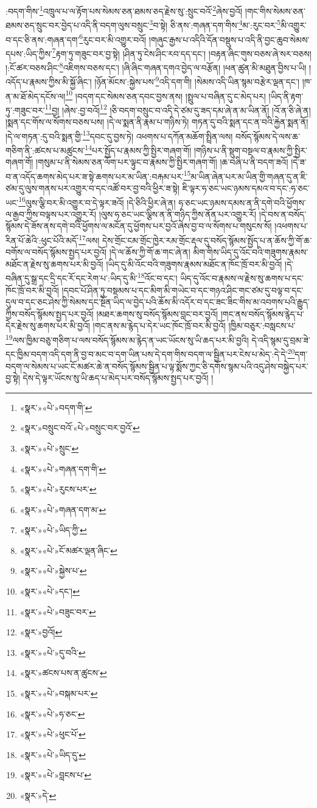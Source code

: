 :བདག་གིས་\footnote{«སྣར་»«པེ་»བདག་གི་}འཁྲུལ་པ་ལ་རྟོག་པས་སེམས་ཅན་ཐམས་ཅད་རྗེས་སུ་:སྲུང་བའོ་\footnote{«སྣར་»བསྲུང་བའོ་«པེ་»བསྲུང་བར་བྱའོ་}ཞེས་བྱའོ། །གང་གིས་སེམས་ཅན་ཐམས་ཅད་སྲུང་བར་བྱེད་པ་འདི་ནི་བདག་ལུས་བསྲུང་\footnote{«སྣར་»«པེ་»སྲུང་}བ་སྟེ། ཅི་ནས་:གཞན་དག་གིས་\footnote{«སྣར་»«པེ་»གཞན་དག་གི་}མ་:རུང་བར་\footnote{«སྣར་»«པེ་»རུངས་པར་}མི་འགྱུར་བ་དང་ཅི་ནས་:གཞན་དག་\footnote{«སྣར་»«པེ་»གཞན་དག་མ་}རུང་བར་མི་འགྱུར་བའོ། །གཞུང་རྒྱས་པ་འདིའི་དོན་བསྡུས་པ་འདི་ནི་བྱང་ཆུབ་སེམས་དཔས་:ཡིད་ཀྱིས་\footnote{«སྣར་»«པེ་»ཡིད་ཀྱི་}རྟག་ཏུ་གཟུང་བར་བྱ་སྟེ། །ཤིན་ཏུ་ངེས་ཤིང་རབ་དད་དང་། །བརྟན་ཞིང་གུས་བཅས་ཞེ་སར་བཅས། །:ངོ་ཚར་བཅས་ཤིང་\footnote{«སྣར་»«པེ་»ངོ་མཚར་ལྡན་ཞིང་}འཇིགས་བཅས་དང་། །ཞི་ཞིང་གཞན་དགའ་བྱེད་ལ་བརྩོན། །ཕན་ཚུན་མི་མཐུན་བྱིས་པ་ཡི། །འདོད་པ་རྣམས་ཀྱིས་མི་སྐྱོ་ཞིང་། །ཉོན་མོངས་:སྐྱེས་པས་\footnote{«སྣར་»«པེ་»སྐྱེས་པ་}འདི་དག་གི། །སེམས་འདི་ཡིན་སྙམ་བརྩེར་ལྡན་དང་། །ཁ་ན་མ་ཐོ་མེད་དངོས་ལ།\footnote{«སྣར་»«པེ་»དང་།} །བདག་དང་སེམས་ཅན་དབང་བྱས་ནས། །སྤྲུལ་པ་བཞིན་དུ་ང་མེད་པར། །ཡིད་ནི་རྟག་ཏུ་:གཟུང་བར་\footnote{«སྣར་»«པེ་»བཟུང་བར་}བྱ། །ཞེས་:བྱ་བའོ།\footnote{«སྣར་»བྱའོ།} །ཅི་བདག་བསྲུང་བ་འདི་དེ་ཙམ་དུ་ཟད་དམ་ཞེ་ན་མ་ཡིན་ནོ། །འོ་ན་ཅི་ཞེ་ན། །སྨན་དང་གོས་ལ་སོགས་བཅས་པས། །དེ་ལ་སྨན་ནི་རྣམ་པ་གཉིས་ཏེ། གཏན་དུ་བའི་སྨན་དང་ན་བའི་རྐྱེན་སྨན་ནོ། །དེ་ལ་གཏན་:དུ་བའི་སྨན་གྱི་\footnote{«སྣར་»«པེ་»དུ་བའི་}དབང་དུ་བྱས་ཏེ། འཕགས་པ་དཀོན་མཆོག་སྤྲིན་ལས། བསོད་སྙོམས་དེ་ལས་ཆ་གཅིག་ནི་:ཚངས་པ་མཚུངས་\footnote{«སྣར་»ཚངས་པས་ན་ཚུངས་}པར་སྤྱོད་པ་རྣམས་ཀྱི་སྤྱིར་གཞག་གོ། །གཉིས་པ་ནི་སྡུག་བསྔལ་བ་རྣམས་ཀྱི་སྤྱིར་གཞག་གོ། །གསུམ་པ་ནི་སེམས་ཅན་ལོག་པར་ལྟུང་བ་རྣམས་ཀྱི་སྤྱིར་གཞག་གོ། །ཆ་བཞི་པ་ནི་བདག་ཟའོ། །དེ་ཟ་བ་ན་འདོད་ཆགས་མེད་པར་ཟ་སྟེ་ཆགས་པར་མ་ཡིན་:བརྐམ་པར་\footnote{«སྣར་»«པེ་»བསྐམ་པར་}མ་ཡིན་ཞེན་པར་མ་ཡིན་གྱི་གཞན་དུ་ན་ཇི་ཙམ་དུ་ལུས་གནས་པར་འགྱུར་བ་དང་འཚོ་བར་བྱ་བའི་ཕྱིར་ཟ་སྟེ། ཇི་ལྟར་ཧ་ཅང་ཡང་ཉམས་དམའ་བ་དང་:ཧ་ཅང་ཡང་\footnote{«སྣར་»«པེ་»ཧ་ཅང་}ལུས་ལྕི་བར་མི་འགྱུར་བ་དེ་ལྟར་ཟའོ། །དེ་ཅིའི་ཕྱིར་ཞེ་ན། ཧ་ཅང་ཡང་ཉམས་དམས་ན་ནི་དགེ་བའི་ཕྱོགས་ལ་རྒྱབ་ཀྱིས་བལྟས་པར་འགྱུར་རོ། །ལུས་ཧ་ཅང་ཡང་ལྕིས་ན་ནི་གཉིད་ཀྱིས་ནོན་པར་འགྱུར་རོ། །དེ་བས་ན་བསོད་སྙོམས་དེ་ཟོས་ནས་དགེ་བའི་ཕྱོགས་ལ་མངོན་དུ་ཕྱོགས་པར་བྱའོ་ཞེས་བྱ་བ་ལ་སོགས་པ་གསུངས་སོ། །འཕགས་པ་རིན་པོ་ཆེའི་:ཕུང་པོའི་མདོ་\footnote{«སྣར་»«པེ་»ཕུང་པོ་}ལས། དེས་གྲོང་ངམ་གྲོང་ཁྱེར་རམ་གྲོང་རྡལ་དུ་བསོད་སྙོམས་སྤྱོད་པ་ན་ཆོས་ཀྱི་གོ་ཆ་བགོས་ལ་བསོད་སྙོམས་སྤྱད་པར་བྱའོ། །དེ་ལ་ཆོས་ཀྱི་གོ་ཆ་གང་ཞེ་ན། མིག་གིས་ཡིད་དུ་འོང་བའི་གཟུགས་རྣམས་མཐོང་ན་རྗེས་སུ་ཆགས་པར་མི་བྱའོ། །ཡིད་དུ་མི་འོང་བའི་གཟུགས་རྣམས་མཐོང་ན་ཁོང་ཁྲོ་བར་མི་བྱའོ། །དེ་བཞིན་དུ་སྒྲ་དང་དྲི་དང་རོ་དང་རེག་པ་:ཡིད་དུ་མི་\footnote{«སྣར་»«པེ་»ཡིད་དུ་}འོང་བ་དང་། ཡིད་དུ་འོང་བ་རྣམས་ལ་རྗེས་སུ་ཆགས་པ་དང་ཁོང་ཁྲོ་བར་མི་བྱའོ། །དབང་པོ་ཤིན་ཏུ་བསྡམས་པ་དང་མིག་མི་གཡེང་བ་དང་གཉའ་ཤིང་གང་ཙམ་དུ་བལྟ་བ་དང་དུལ་བ་དང་ཅང་ཤེས་ཀྱི་སེམས་དང་སྔོན་ཡིད་ལ་བྱེད་པའི་ཆོས་མི་འདོར་བ་དང་ཟང་ཟིང་གིས་མ་འབགས་པའི་རྒྱུད་ཀྱིས་བསོད་སྙོམས་སྤྱད་པར་བྱའོ། །མཐར་ཆགས་སུ་བསོད་སྙོམས་བླང་བར་བྱའོ། །གང་ནས་བསོད་སྙོམས་རྙེད་པ་དེར་རྗེས་སུ་ཆགས་པར་མི་བྱའོ། །གང་ནས་མ་རྙེད་པ་དེར་ཡང་ཁོང་ཁྲོ་བར་མི་བྱའོ། །ཁྱིམ་བཅུར་:བསླངས་པ་\footnote{«སྣར་»«པེ་»བླངས་པ་}ལས་ཁྱིམ་བཅུ་གཅིག་པ་ལས་བསོད་སྙོམས་མ་རྙེད་ན་ཡང་ཡོངས་སུ་ཡི་ཆད་པར་མི་བྱའི། དེ་འདི་སྙམ་དུ་བྲམ་ཟེ་དང་ཁྱིམ་བདག་འདི་དག་ནི་བྱ་བ་མང་བ་དག་ཡིན་པས་དེ་དག་གིས་བདག་ལ་སྦྱིན་པར་ངེས་པ་མེད་:དེ་དེ་\footnote{«སྣར་»དེ་}དག་བདག་ལ་སེམས་པ་ཡང་ངོ་མཚར་ཆེ་ན་བསོད་སྙོམས་སྦྱིན་པ་ལྟ་སྨོས་ཀྱང་ཅི་དགོས་སྙམ་པའི་འདུ་ཤེས་བསྐྱེད་པར་བྱ་སྟེ། དེས་དེ་ལྟར་ཡོངས་སུ་ཡི་ཆད་པ་མེད་པར་བསོད་སྙོམས་སྤྱད་པར་བྱའོ། །
